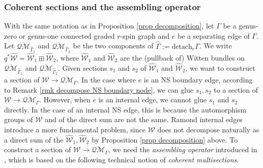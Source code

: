 \documentclass[11pt]{amsart}
\theoremstyle{definition}
\theoremstyle{remark}
\newcommand{\oQMb}{{\overline{\mathcal{QM}}}}
\newcommand{\<}{\left<}
\renewcommand{\>}{\right>}
\numberwithin{equation}{section}
\begin{document}
\subsubsection{Coherent sections and the assembling operator}\label{sec ass} 

   With the same notation as in Proposition \ref{prop decomposition}, let $\Gamma$ be a genus-zero or genus-one connected graded $r$-spin graph and $e$ be a separating edge %
of $\Gamma$. Let $\oQMb_{\widehat{\Gamma}_1}$ %
and $\oQMb_{\widehat{\Gamma}_2}$ be the two components of $\widehat\Gamma:={\text{detach} }_e{\Gamma}$. We write $q^*\widehat{\mathcal{W}} = \widehat{\mathcal{W}}_1 \boxplus \widehat{\mathcal{W}}_2$, where $\widehat{\mathcal{W}}_1$ and $\widehat{\mathcal{W}}_2$ are the (pullback of) Witten bundles on $\oQMb_{\widehat{\Gamma}_1}$ and $\oQMb_{\widehat{\Gamma}_2}$. 
   Given sections $s_1$ and $s_2$ of $\widehat{\mathcal{W}}_1$ and $\widehat{\mathcal{W}}_2$, we want to construct a section of $\mathcal W \to \oQMb_\Gamma$. In the case where $e$ is an NS boundary edge, according to Remark \ref{rmk decompose NS boundary node}, we can glue $s_1,s_2$ 
 to a section of $\mathcal W \to \oQMb_\Gamma$. However, when $e$ is an internal edge, we cannot glue $s_1$ and $s_2$ directly. In the case of an internal NS edge, this is because the automorphism groups of ${\mathcal{W}}$ and of the direct sum are not the same. Ramond internal edges introduce a more fundamental problem, since ${\mathcal{W}}$ does not decompose naturally as a direct sum of %
the $\widehat{\mathcal{W}}_1,\widehat{\mathcal{W}}_2$ by %
Proposition \ref{prop decomposition} above. To construct a section of $\mathcal W \to \overline{\mathcal{QM}}_\Gamma$, we need the \textit{assembling operator} introduced in \cite{BCT2}, which is based on the following technical notion of \textit{coherent multisections}. 
  
\end{document}
